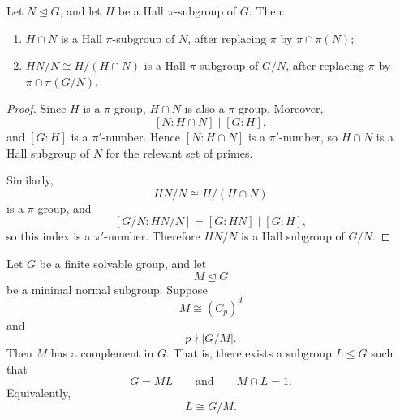 \begin{lemma}
Let \(N\trianglelefteq G\), and let \(H\) be a Hall \(\pi\)-subgroup of \(G\).
Then:
\begin{enumerate}[label=\textup{(\arabic*)}]
    \item \(H\cap N\) is a Hall \(\pi\)-subgroup of \(N\), after replacing
    \(\pi\) by \(\pi\cap \pi(N)\);
    \item \(HN/N\cong H/(H\cap N)\) is a Hall \(\pi\)-subgroup of \(G/N\),
    after replacing \(\pi\) by \(\pi\cap \pi(G/N)\).
\end{enumerate}
\end{lemma}

\begin{proof}
Since \(H\) is a \(\pi\)-group, \(H\cap N\) is also a \(\pi\)-group. Moreover,
\[
    [N:H\cap N]\mid [G:H],
\]
and \([G:H]\) is a \(\pi'\)-number. Hence \([N:H\cap N]\) is a \(\pi'\)-number,
so \(H\cap N\) is a Hall subgroup of \(N\) for the relevant set of primes.

Similarly,
\[
    HN/N\cong H/(H\cap N)
\]
is a \(\pi\)-group, and
\[
    [G/N:HN/N]=[G:HN]\mid [G:H],
\]
so this index is a \(\pi'\)-number. Therefore \(HN/N\) is a Hall subgroup of
\(G/N\).
\end{proof}

\begin{lemma}
Let \(G\) be a finite solvable group, and let
\[
    M\trianglelefteq G
\]
be a minimal normal subgroup. Suppose
\[
    M\cong (C_p)^d
\]
and
\[
    p\nmid |G/M|.
\]
Then \(M\) has a complement in \(G\). That is, there exists a subgroup
\(L\leq G\) such that
\[
    G=ML
    \qquad\text{and}\qquad
    M\cap L=1.
\]
Equivalently,
\[
    L\cong G/M.
\]
\end{lemma}

